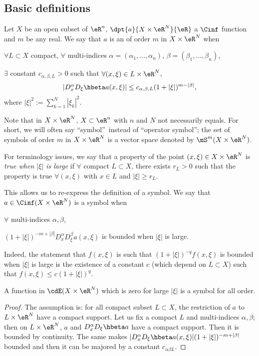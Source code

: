 \subsection{Basic definitions}

\begin{definition}
Let $X$ be an open subset of $\eR^n$, $\dpt{a}{X\times\eR^N}{\eR}$ a $\Cinf$ function and $m$ be any real. We say that $a$ is an  of order $m$ in $X\times\eR^N$ when

$\forall L\subset X$ compact, $\forall$ multi-indices $\alpha=(\alpha_1,\ldots,\alpha_n)$, $\beta=(\beta_1,\ldots,\beta_n)$,

$\exists$ constant $c_{\alpha,\beta,L}>0$ such that $\forall (x,\xi)\in L\times\eR^N$,
\begin{equation}\label{eq:cond_symbol}
  |D_x^{\alpha} D_{\xi}\hbeta a(x,\xi)|\leq c_{\alpha,\beta,L}(1+|\xi|)^{m-|\beta|},
\end{equation}
where $|\xi|^2:=\sum_{k=1}^{N}|\xi_k|^2$.
\end{definition}

Note that in $X\times \eR^N$, $X\subset\eR^n$ with $n$ and $N$ not necessarily equals. For short, we will often say ``symbol''\ instead of ``operator symbol''; the set of symbols of order $m$ in $X\times\eR^N$  is a vector space denoted by $\mS^m(X\times\eR^N)$\label{pg:defmS}.

For terminology issues, we say that a property of the point $(x,\xi)\in X\times\eR^N$ is \emph{true when $|\xi|$ is large} if $\forall$ compact $L\subset X$, there exists $r_L>0$ such that the property is true $\forall(x,\xi)$ with $x\in L$ and $|\xi|\geq r_L$.

\noindent This allows us to re-express the definition of a symbol. We say that $a\in\Cinf(X\times\eR^N)$ is a symbol when

$\forall$ multi-indices $\alpha,\beta$,

$(1+|\xi|)^{-m+|\beta|}D_x^{\alpha}D_{\xi}^{\beta}a(x,\xi)$ is bounded when $|\xi|$ is large.
 
 \noindent Indeed, the statement that $f(x,\xi)$ is such that $(1+|\xi|)^{-q}f(x,\xi)$ is bounded when $|\xi|$ is large is the existence of a constant $c$ (which depend on $L\subset X$) such that $f(x,\xi)\leq c(1+|\xi|)^q$.

\begin{proposition}
   A function in $\cdE(X\times\eR^N)$ which is zero for large $| \xi |$ is a symbol for all order.
\end{proposition}
\begin{proof}
 The assumption is: for all compact subset $L\subset X$, the restriction of $a$ to $L\times\eR^N$ have a compact support. Let us fix a compact $L$ and multi-indices $\alpha,\beta$; then on $L\times\eR^N$, $a$ and $D_x^{\alpha} D_{\xi}\hbeta a$ have a compact support. Then it is bounded by continuity. The same makes $|D_x^{\alpha} D_{\xi}\hbeta a(x,\xi)|(1+|\xi|)^{-m+|\beta|}$ bounded and then it can be majored by a constant $c_{\alpha\beta L}$.
\end{proof}

